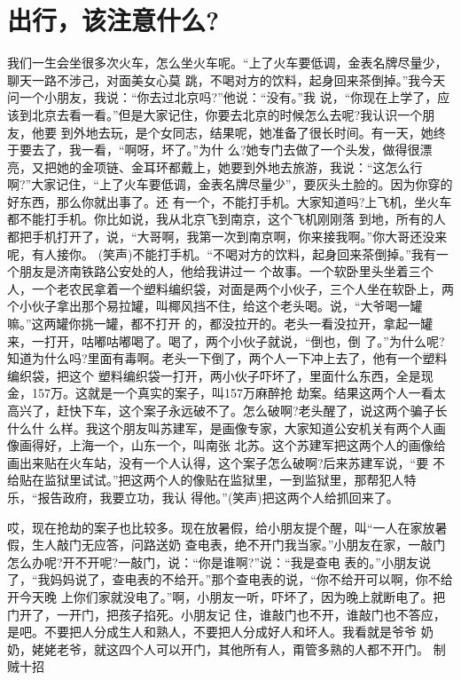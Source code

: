 \documentclass[11pt,a4paper,onecolumn]{article}
\begin{document}
\section{出行，该注意什么?}

我们一生会坐很多次火车，怎么坐火车呢。``上了火车要低调，金表名牌尽量少，聊天一路不涉己，对面美女心莫
跳，不喝对方的饮料，起身回来茶倒掉。''我今天问一个小朋友，我说：``你去过北京吗?''他说：``没有。''我
说，``你现在上学了，应该到北京去看一看。''但是大家记住，你要去北京的时候怎么去呢?我认识一个朋友，他要
到外地去玩，是个女同志，结果呢，她准备了很长时间。有一天，她终于要去了，我一看，``啊呀，坏了。''为什
么?她专门去做了一个头发，做得很漂亮，又把她的金项链、金耳环都戴上，她要到外地去旅游，我说：``这怎么行
啊?''大家记住，``上了火车要低调，金表名牌尽量少''，要灰头土脸的。因为你穿的好东西，那么你就出事了。还
有一个，不能打手机。大家知道吗?上飞机，坐火车都不能打手机。你比如说，我从北京飞到南京，这个飞机刚刚落
到地，所有的人都把手机打开了，说，``大哥啊，我第一次到南京啊，你来接我啊。''你大哥还没来呢，有人接你。
(笑声)不能打手机。``不喝对方的饮料，起身回来茶倒掉。''我有一个朋友是济南铁路公安处的人，他给我讲过一
个故事。一个软卧里头坐着三个人，一个老农民拿着一个塑料编织袋，对面是两个小伙子，三个人坐在软卧上，两
个小伙子拿出那个易拉罐，叫椰风挡不住，给这个老头喝。说，``大爷喝一罐嘛。''这两罐你挑一罐，都不打开
的，都没拉开的。老头一看没拉开，拿起一罐来，一打开，咕嘟咕嘟喝了。喝了，两个小伙子就说，``倒也，倒
了。''为什么呢?知道为什么吗?里面有毒啊。老头一下倒了，两个人一下冲上去了，他有一个塑料编织袋，把这个
塑料编织袋一打开，两小伙子吓坏了，里面什么东西，全是现金，157万。这就是一个真实的案子，叫157万麻醉抢
劫案。结果这两个人一看太高兴了，赶快下车，这个案子永远破不了。怎么破啊?老头醒了，说这两个骗子长什么什
么样。我这个朋友叫苏建军，是画像专家，大家知道公安机关有两个人画像画得好，上海一个，山东一个，叫南张
北苏。这个苏建军把这两个人的画像给画出来贴在火车站，没有一个人认得，这个案子怎么破啊?后来苏建军说，``要
不给贴在监狱里试试。''把这两个人的像贴在监狱里，一到监狱里，那帮犯人特乐，``报告政府，我要立功，我认
得他。''(笑声)把这两个人给抓回来了。

哎，现在抢劫的案子也比较多。现在放暑假，给小朋友提个醒，叫``一人在家放暑假，生人敲门无应答，问路送奶
查电表，绝不开门我当家。''小朋友在家，一敲门怎么办呢?开不开呢?一敲门，说：``你是谁啊?''说：``我是查电
表的。''小朋友说了，``我妈妈说了，查电表的不给开。''那个查电表的说，``你不给开可以啊，你不给开今天晚
上你们家就没电了。''啊，小朋友一听，吓坏了，因为晚上就断电了。把门开了，一开门，把孩子掐死。小朋友记
住，谁敲门也不开，谁敲门也不答应，是吧。不要把人分成生人和熟人，不要把人分成好人和坏人。我看就是爷爷
奶奶，姥姥老爷，就这四个人可以开门，其他所有人，甭管多熟的人都不开门。 制贼十招
\end{document}
